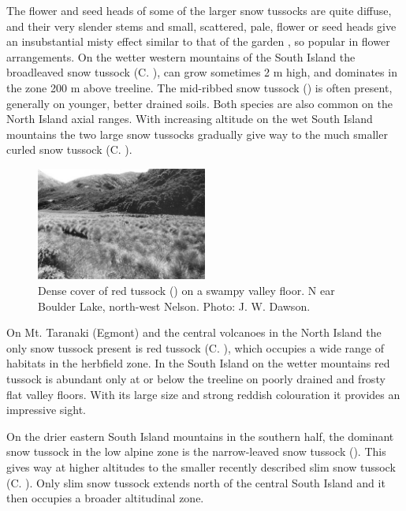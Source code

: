 The flower and seed heads of some of the larger snow tussocks are quite diffuse, and their very slender stems and small, scattered, pale, flower or seed heads give an insubstantial misty effect similar to that of the garden , so popular in flower arrangements.
On the wetter western mountains of the South Island the broadleaved snow tussock (C. ), can grow sometimes 2 m high, and dominates in the zone 200 m above treeline.
The mid-ribbed snow tussock () is often present, generally on younger, better drained soils.
Both species are also common on the North Island axial ranges.
With increasing altitude on the wet South Island mountains the two large snow tussocks gradually give way to the much smaller curled snow tussock (C. ).

\begin{figure}
	\includegraphics[width=0.5\textwidth]{graphics/figure97red-tussock.jpg}
	\centering
	\caption[Red tussock]{Dense cover of red tussock () on a swampy valley floor.
N   ear Boulder Lake, north-west Nelson.
	Photo: J. W. Dawson.}
	\label{fig:97red-tussock}
\end{figure}

On Mt. Taranaki (Egmont) and the central volcanoes in the North Island the only snow tussock present is red tussock (C. ), which occupies a wide range of habitats in the herbfield zone.
In the South Island on the wetter mountains red tussock is abundant only at or below the treeline on poorly drained and frosty flat valley floors.
With its large size and strong reddish colouration it provides an impressive sight.

On the drier eastern South Island mountains in the southern half, the dominant snow tussock in the low alpine zone is the narrow-leaved snow tussock ().
This gives way at higher altitudes to the smaller recently described slim snow tussock (C. ).
Only slim snow tussock extends north of the central South Island and it then occupies a broader altitudinal zone.

